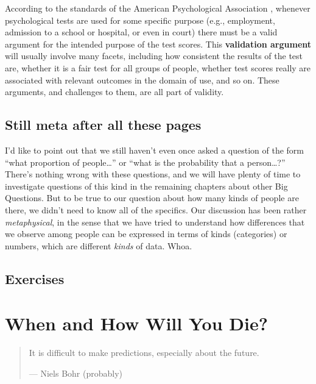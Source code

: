 \documentclass[]{book}
\begin{document}
According to the standards of the American Psychological Association \citep{american1999}, whenever psychological tests are used for some specific purpose (e.g., employment, admission to a school or hospital, or even in court) there must be a valid argument for the intended purpose of the test scores. This \textbf{validation argument} will usually involve many facets, including how consistent the results of the test are, whether it is a fair test for all groups of people, whether test scores really are associated with relevant outcomes in the domain of use, and so on. These arguments, and challenges to them, are all part of validity.

\hypertarget{still-meta-after-all-these-pages}{%
\section*{Still meta after all these pages}\label{still-meta-after-all-these-pages}}

I'd like to point out that we still haven't even once asked a question of the form ``what proportion of people\ldots{}'' or ``what is the probability that a person\ldots{}?'' There's nothing wrong with these questions, and we will have plenty of time to investigate questions of this kind in the remaining chapters about other Big Questions. But to be true to our question about how many kinds of people are there, we didn't need to know all of the specifics. Our discussion has been rather \emph{metaphysical}, in the sense that we have tried to understand how differences that we observe among people can be expressed in terms of kinds (categories) or numbers, which are different \emph{kinds} of data. Whoa.

\hypertarget{exercises}{%
\section*{Exercises}\label{exercises}}

\hypertarget{when-and-how-will-you-die}{%
\chapter{When and How Will You Die?}\label{when-and-how-will-you-die}}

\begin{quote}
It is difficult to make predictions, especially about the future.

--- Niels Bohr (probably)
\end{quote}
\end{document}

